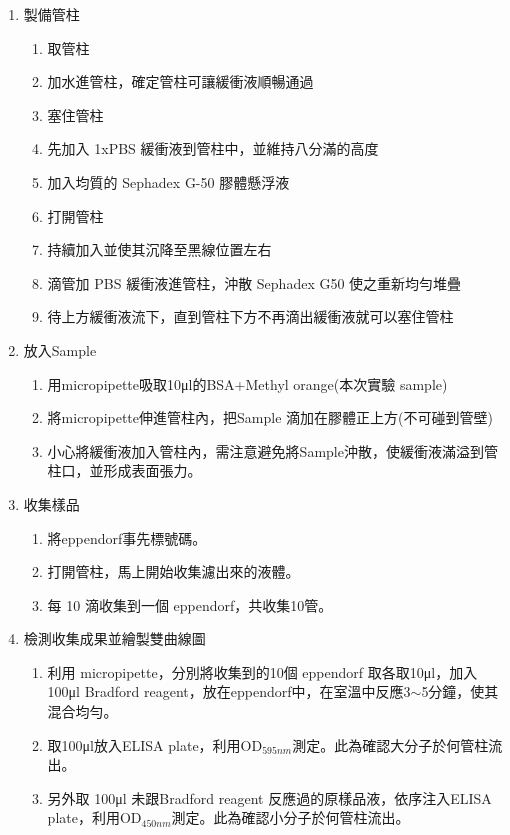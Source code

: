 \begin{enumerate}[label=\arabic*.]
  \item 製備管柱
  \begin{enumerate}[label=(\arabic*)]
    \item 取管柱
  
    \item 加水進管柱，確定管柱可讓緩衝液順暢通過
    \item 塞住管柱
    \item 先加入 1xPBS 緩衝液到管柱中，並維持八分滿的高度
    \item 加入均質的 Sephadex G-50 膠體懸浮液
    \item 打開管柱
    \item 持續加入並使其沉降至黑線位置左右
    \item 滴管加 PBS 緩衝液進管柱，沖散 Sephadex G50 使之重新均勻堆疊
    \item 待上方緩衝液流下，直到管柱下方不再滴出緩衝液就可以塞住管柱
  \end{enumerate}
  \item 放入Sample
  \begin{enumerate}[label=(\arabic*)]
    \item 用micropipette吸取10μl的BSA+Methyl orange(本次實驗 sample)
    \item 將micropipette伸進管柱內，把Sample 滴加在膠體正上方(不可碰到管壁)
    \item 小心將緩衝液加入管柱內，需注意避免將Sample沖散，使緩衝液滿溢到管柱口，並形成表面張力。
  \end{enumerate}
  \item 收集樣品
  \begin{enumerate}[label=(\arabic*)]
    \item 將eppendorf事先標號碼。
    \item 打開管柱，馬上開始收集濾出來的液體。
    \item 每 10 滴收集到一個 eppendorf，共收集10管。
  \end{enumerate}
  \item 檢測收集成果並繪製雙曲線圖
  \begin{enumerate}[label=(\arabic*)]
    \item 利用 micropipette，分別將收集到的10個 eppendorf 取各取10μl，加入 100μl Bradford reagent，放在eppendorf中，在室溫中反應3$\sim$5分鐘，使其混合均勻。
    \item 取100μl放入ELISA plate，利用OD$_{595nm}$測定。此為確認大分子於何管柱流出。
    \item 另外取 100μl 未跟Bradford reagent 反應過的原樣品液，依序注入ELISA plate，利用OD$_{450nm}$測定。此為確認小分子於何管柱流出。

\end{enumerate}
\end{enumerate}
